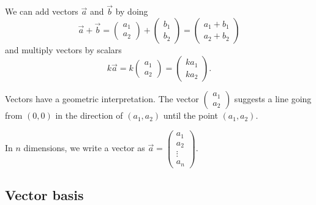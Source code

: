 \documentclass[a4paper, 12pt,oneside,openany]{book}
\begin{document}


We can add vectors $\vec{a}$ and $\vec{b}$ by doing $$\vec{a} + \vec{b} = \begin{pmatrix} a_1 \\a_2  \end{pmatrix} + \begin{pmatrix} b_1 \\b_2  \end{pmatrix} = \begin{pmatrix} a_1+b_1 \\a_2+b_2  \end{pmatrix}$$ and multiply vectors by scalars $$k\vec{a}  = k\begin{pmatrix} a_1 \\a_2  \end{pmatrix}  = \begin{pmatrix} ka_1 \\ka_2  \end{pmatrix}.$$

Vectors have a geometric interpretation. The vector $\begin{pmatrix} a_1 \\a_2  \end{pmatrix}$ suggests a line going from $(0, 0)$ in the direction of $(a_1, a_2)$ until the point $(a_1, a_2)$.


In $n$ dimensions, we write a vector as $\vec{a} = \begin{pmatrix} a_1 \\ a_2 \\ \vdots \\ a_n \end{pmatrix}$. 

\subsection{Vector basis}
\end{document}

